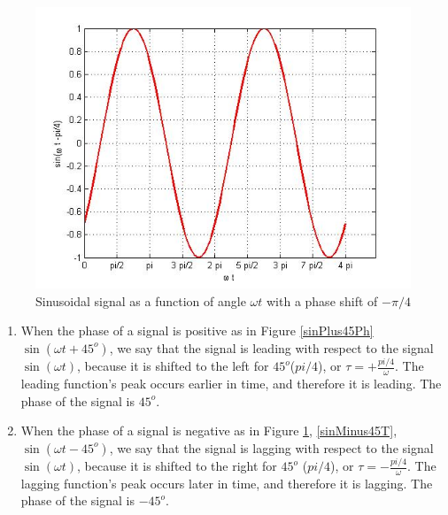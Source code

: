 \documentclass{ximera}
\begin{document}
\begin{enumerate}
\begin{figure} [htbp]
\includegraphics[scale=0.4]{jpg/cpef4.jpg}
\caption{Sinusoidal signal as a function of angle $\omega t$ with a phase shift of $-\pi/4$}
\label{sinMinus45Ph}
\end{figure}

\begin{enumerate}
\item When the phase of a signal is positive as in Figure \ref{sinPlus45Ph} $ \sin (\omega t + 45^o)$, we say that the signal is leading with respect to the signal $ \sin (\omega t)$, because it is shifted to the left for $45^o$($pi/4$), or $\tau=+\frac{pi/4}{\omega} $. The leading function's peak occurs earlier in time, and therefore it is leading. The phase of the signal is $45^o$. 





\item When the phase of a signal is negative as in Figure \ref{sinMinus45Ph}, \ref{sinMinus45T},  $ \sin (\omega t - 45^o)$, we say that the signal is lagging with respect to the signal $ \sin (\omega t)$, because it is shifted to the right for $45^o$ ($pi/4$), or $\tau=-\frac{pi/4}{\omega} $. The lagging function's peak occurs later in time, and therefore it is lagging. The phase of the signal is $-45^o$.



\end{enumerate}
\end{enumerate}
\end{document}
